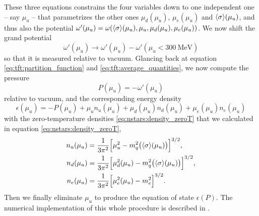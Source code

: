 These three equations constrains the four variables down to one independent one -- say $\mu_u$ -- that parametrizes the other ones $\mu_d(\mu_u)$, $\mu_e(\mu_u)$ and $\langle \sigma \rangle(\mu_u)$, and thus also the potential $\omega'(\mu_u) = \omega(\langle \sigma \rangle(\mu_u), \mu_u, \mu_d(\mu_u), \mu_e(\mu_u))$.
We now shift the grand potential
\begin{equation}
	\omega'(\mu_u) \rightarrow \omega'(\mu_u) - \omega'(\mu_u<\SI{300}{\mega\electronvolt})
\end{equation}
so that it is measured relative to vacuum.
Glancing back at equation \eqref{eq:tft:partition_function} and \eqref{eq:tft:average_quantities}, we now compute the pressure
\begin{equation}
	P(\mu_u) = -\omega'(\mu_u)
\end{equation}
relative to vacuum, and the corresponding energy density
\begin{equation}
	\epsilon(\mu_u) = -P(\mu_u) + \mu_u n_u(\mu_u) + \mu_d(\mu_u) n_d(\mu_u) + \mu_e(\mu_u) n_e(\mu_u)
\end{equation}
with the zero-temperature densities \eqref{eq:nstars:density_zeroT} that we calculated in equation \eqref{eq:nstars:density_zeroT},
\begin{subequations}
\begin{align}
	n_u(\mu_u) &= \frac{1}{3\pi^2} \Big[ \mu_u^2-m_q^2\big(\langle \sigma \rangle(\mu_u)\big) \Big]^{3/2}, \\
	n_d(\mu_u) &= \frac{1}{3\pi^2} \Big[ \mu_d^2(\mu_u)-m_q^2\big(\langle \sigma \rangle(\mu_u)\big) \Big]^{3/2}, \\
	n_e(\mu_u) &= \frac{1}{3\pi^2} \Big[ \mu_e^2(\mu_u)-m_e^2 \Big]^{3/2}.
\end{align}
\end{subequations}
Then we finally eliminate $\mu_u$ to produce the equation of state $\epsilon(P)$.
The numerical implementation of this whole procedure is described in .

